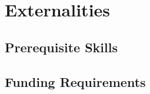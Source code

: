 \documentclass[conference]{IEEEtran} %
\begin{document}

\section{Externalities}
\subsection{Prerequisite Skills}


\subsection{Funding Requirements}
\end{document}
